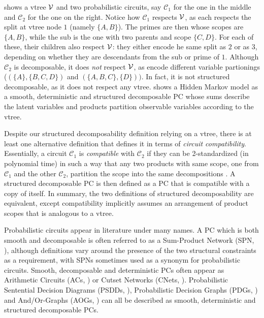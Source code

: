  shows a vtree $\operatorname{\mathcal{V}}$ and two probabilistic circuits, say
$\mathcal{C}_1$ for the one in the middle and $\mathcal{C}_2$ for the one on the right. Notice how
$\mathcal{C}_1$ respects $\operatorname{\mathcal{V}}$, as each \inode[fill=boxred!70]{\newProdNode} respects the split
at vtree node $1$ (namely $\{A,B\}$). The primes are then \inode[fill=boxpurple!60]{\newSumNode}
whose scopes are $\{A,B\}$, while the sub is the one with two parents and scope $\{C,D\}$. For each
of these, their children \inode[fill=boxbrown!60]{\newProdNode} also respect $\operatorname{\mathcal{V}}$: they either
encode he same split as $2$ or as $3$, depending on whether they are descendants from the sub or
prime of $1$. Although $\mathcal{C}_2$ is decomposable, it does \emph{not} respect $\operatorname{\mathcal{V}}$, as
\inode[fill=boxred!70]{\newProdNode} encode different variable partionings ($(\{A\},\{B,C,D\})$ and
$(\{A,B,C\},\{D\}))$. In fact, it is not structured decomposable, as it does not respect any vtree.
 shows a Hidden Markov model as a smooth, deterministic and structured decomposable PC
whose sums describe the latent variables and products partition observable variables according to
the vtree.

Despite our structured decomposability definition relying on a vtree, there is at least one
alternative definition that defines it in terms of \emph{circuit compatibility}. Essentially, a
circuit $\mathcal{C}_1$ is \emph{compatible} with $\mathcal{C}_2$ if they can be 2-standardized (in
polynomial time) in such a way that any two products with same scope, one from $\mathcal{C}_1$ and
the other $\mathcal{C}_2$, partition the scope into the same decompositions \citep{vergari21}. A
structured decomposable PC is then defined as a PC that is compatible with a copy of itself. In
summary, the two definitions of structured decomposability are equivalent, except compatibility
implicitly assumes an arrangement of product scopes that is analogous to a vtree.

Probabilistic circuits appear in literature under many names. A PC which is both smooth and
decomposable is often referred to as a Sum-Product Network (SPN, \cite{poon11}), although
definitions vary around the presence of the two structural constraints as a requirement, with SPNs
sometimes used as a synonym for probabilistic circuits. Smooth, decomposable and deterministic PCs
often appear as Arithmetic Circuits (ACs, \cite{darwiche03}) or Cutset Networks (CNets,
\cite{rahman14}). Probabilistic Sentential Decision Diagrams (PSDDs, \cite{kisa14}), Probabilistic
Decision Graphs (PDGs, \cite{jaeger04}) and And/Or-Graphs (AOGs, \cite{dechter07}) can all be
described as smooth, deterministic and structured decomposable PCs.

